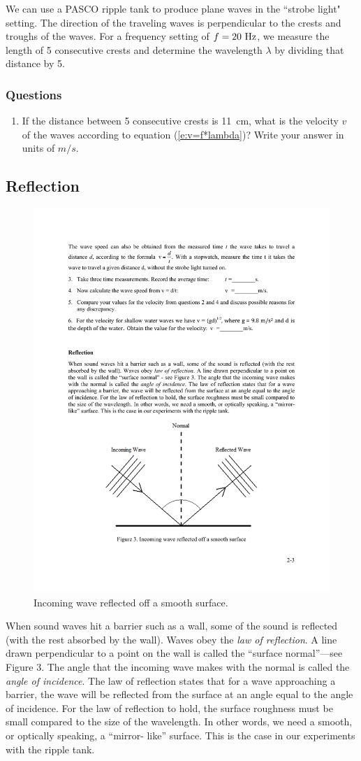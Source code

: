 \documentclass[11pt]{NSF}
\def\ben{\begin{enumerate}}
\def\een{\end{enumerate}}
\def\i{\item{}}
\begin{document}
We can use a PASCO ripple tank to produce plane waves in the ``strobe
light" setting.
The direction of the traveling waves is perpendicular to the 
crests and troughs of the waves.
For a frequency setting of $f=20~{\rm Hz}$, we measure the
length of 5 consecutive crests and determine the wavelength $\lambda$
by dividing that distance by 5.

\subsubsection*{Questions}
\ben

\i 
If the distance between 5 consecutive crests is 11~cm, what is the 
velocity $v$ of the waves according to equation (\ref{e:v=f*lambda})?
Write your answer in units of $m/s$.
\een

\subsection{Reflection}
%
\begin{figure}[hbtp]
\begin{center}
\includegraphics[width=.6\textwidth]{fig2_3}
\caption{Incoming wave reflected off a smooth surface.}
\label{f:3}
\end{center}
\end{figure}
%
When sound waves hit a barrier such as a wall, some of the sound is reflected
(with the rest absorbed by the wall). 
Waves obey the {\em law of reflection}. 
A line
drawn perpendicular to a point on the wall is called the ``surface normal”---see
Figure 3. The angle that the incoming wave makes with the normal is called the
{\em angle of incidence}. The law of reflection states that for a wave approaching a
barrier, the wave will be reflected from the surface at an angle equal to the
angle of incidence. For the law of reflection to hold, the surface roughness
must be small compared to the size of the wavelength. In other words, we need a
smooth, or optically speaking, a ``mirror- like” surface. This is the case in
our experiments with the ripple tank.
\end{document}
